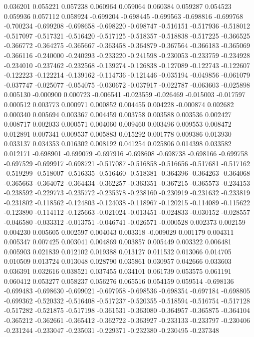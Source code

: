0.036201
0.055221
0.057238
0.060964
0.059064
0.060384
0.059287
0.054523
0.059936
0.057112
0.058924
-0.699204
-0.698445
-0.699563
-0.698816
-0.699768
-0.700234
-0.699208
-0.698658
-0.698220
-0.698747
-0.516151
-0.517936
-0.518012
-0.517097
-0.517321
-0.516420
-0.517125
-0.518357
-0.518838
-0.517225
-0.366525
-0.366772
-0.364275
-0.365667
-0.363458
-0.364879
-0.367564
-0.366183
-0.365069
-0.366116
-0.240000
-0.240293
-0.233220
-0.241598
-0.230053
-0.233759
-0.234928
-0.234010
-0.237462
-0.232568
-0.139274
-0.126838
-0.127089
-0.122743
-0.122607
-0.122223
-0.122214
-0.139162
-0.114736
-0.121446
-0.035194
-0.049856
-0.061079
-0.037747
-0.025077
-0.054075
-0.030672
-0.037917
-0.022787
-0.063603
-0.025898
0.005130
-0.000900
0.000723
-0.006541
-0.023559
-0.026469
-0.015003
-0.017597
0.000512
0.003773
0.000971
0.000852
0.004455
0.004228
-0.000874
0.002682
0.000340
0.005694
0.003367
0.004459
0.003758
0.003588
0.003536
0.002427
0.008717
0.002033
0.000571
0.004060
0.009460
0.003496
0.009553
0.008472
0.012891
0.007341
0.009537
0.005883
0.015292
0.001778
0.009386
0.013930
0.033137
0.034353
0.016302
0.008192
0.041254
0.025806
0.014398
0.033582
0.012171
-0.698901
-0.699079
-0.697916
-0.698608
-0.698738
-0.698166
-0.699758
-0.697529
-0.699917
-0.698721
-0.517087
-0.516858
-0.516656
-0.517681
-0.517162
-0.519299
-0.518007
-0.516335
-0.516460
-0.518381
-0.364396
-0.364263
-0.364068
-0.365663
-0.364072
-0.364434
-0.362257
-0.363351
-0.367215
-0.365573
-0.234153
-0.238592
-0.229773
-0.235772
-0.235378
-0.238160
-0.230919
-0.231632
-0.233819
-0.231802
-0.118562
-0.124803
-0.124038
-0.118967
-0.120215
-0.114089
-0.115622
-0.123890
-0.114112
-0.125663
-0.021024
-0.013451
-0.024833
-0.030152
-0.028557
-0.046580
-0.033312
-0.013751
-0.046741
-0.026571
-0.000528
0.002373
0.002159
0.004230
0.005605
0.002597
0.004043
0.003318
-0.009029
0.001179
0.004311
0.005347
0.007425
0.003041
0.004869
0.003857
0.005449
0.003322
0.006481
0.005903
0.021839
0.012102
0.019388
0.013127
0.011532
0.013066
0.014705
0.010509
0.013724
0.013048
0.028790
0.035861
0.030957
0.042666
0.033603
0.036391
0.032616
0.038521
0.037455
0.034101
0.061739
0.053575
0.061191
0.060412
0.053277
0.058237
0.056276
0.065516
0.054159
0.059514
-0.698136
-0.699483
-0.698630
-0.699021
-0.697958
-0.698536
-0.698354
-0.697184
-0.698805
-0.699362
-0.520332
-0.516408
-0.517237
-0.520355
-0.518594
-0.516754
-0.517128
-0.517282
-0.521875
-0.517198
-0.361531
-0.363080
-0.364957
-0.365875
-0.364104
-0.365212
-0.362661
-0.365412
-0.362722
-0.363927
-0.233133
-0.233797
-0.230406
-0.231244
-0.233047
-0.235031
-0.229371
-0.232380
-0.230495
-0.237348
